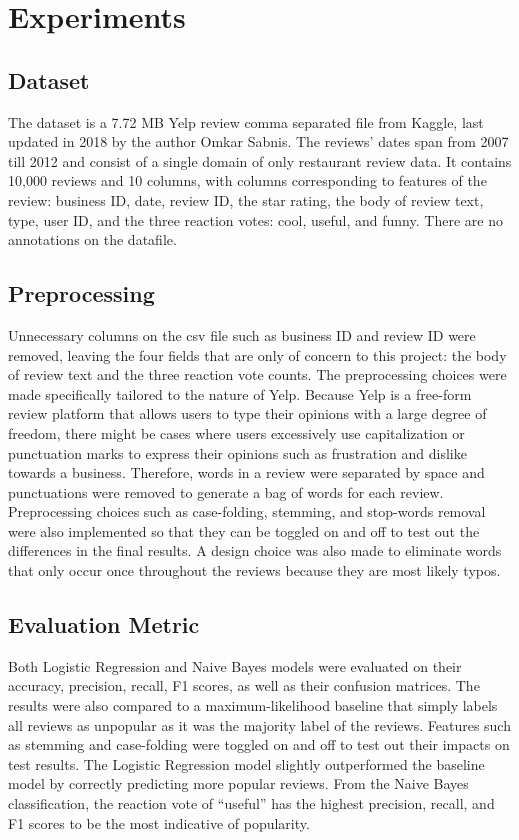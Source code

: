 \documentclass[11pt,a4paper]{article}
\begin{document}
\section{Experiments}
\subsection{Dataset}
The dataset is a 7.72 MB Yelp review comma separated file from Kaggle, last updated in 2018 by the author Omkar Sabnis. The reviews’ dates span from 2007 till 2012 and consist of a single domain of only restaurant review data. It contains 10,000 reviews and 10 columns, with columns corresponding to features of the review: business ID, date, review ID, the star rating, the body of review text, type, user ID, and the three reaction votes: cool, useful, and funny. There are no annotations on the datafile.

\subsection{Preprocessing}
Unnecessary columns on the csv file such as business ID and review ID were removed, leaving the four fields that are only of concern to this project: the body of review text and the three reaction vote counts. The preprocessing choices were made specifically tailored to the nature of Yelp. Because Yelp is a free-form review platform that allows users to type their opinions with a large degree of freedom, there might be cases where users excessively use capitalization or punctuation marks to express their opinions such as frustration and dislike towards a business. Therefore, words in a review were separated by space and punctuations were removed to generate a bag of words for each review. Preprocessing choices such as case-folding, stemming, and stop-words removal were also implemented so that they can be toggled on and off to test out the differences in the final results. A design choice was also made to eliminate words that only occur once throughout the reviews because they are most likely typos.

\subsection{Evaluation Metric}
Both Logistic Regression and Naive Bayes models were evaluated on their accuracy, precision, recall, F1 scores, as well as their confusion matrices. The results were also compared to a maximum-likelihood baseline that simply labels all reviews as unpopular as it was the majority label of the reviews. Features such as stemming and case-folding were toggled on and off to test out their impacts on test results.
The Logistic Regression model slightly outperformed the baseline model by correctly predicting more popular reviews. From the Naive Bayes classification, the reaction vote of “useful” has the highest precision, recall, and F1 scores to be the most indicative of popularity.
\end{document}
